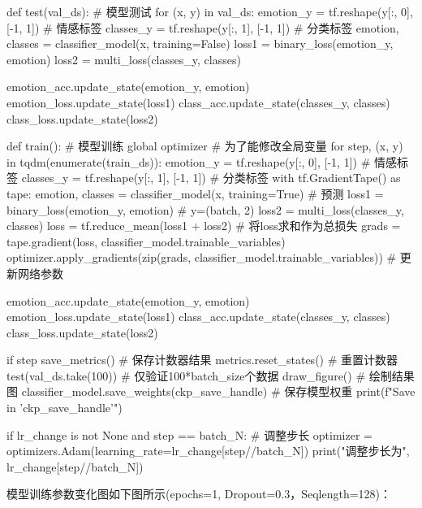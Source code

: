 \documentclass[12pt, a4paper, oneside]{ctexart}
\numberwithin{equation}{section}  %
\begin{document}
\begin{pythoncode}
def test(val_ds):  # 模型测试
    for (x, y) in val_ds:
        emotion_y = tf.reshape(y[:, 0], [-1, 1])  # 情感标签
        classes_y = tf.reshape(y[:, 1], [-1, 1])  # 分类标签
        emotion, classes = classifier_model(x, training=False)
        loss1 = binary_loss(emotion_y, emotion)
        loss2 = multi_loss(classes_y, classes)

        emotion_acc.update_state(emotion_y, emotion)
        emotion_loss.update_state(loss1)
        class_acc.update_state(classes_y, classes)
        class_loss.update_state(loss2)

def train():  # 模型训练
    global optimizer  # 为了能修改全局变量
    for step, (x, y) in tqdm(enumerate(train_ds)):
        emotion_y = tf.reshape(y[:, 0], [-1, 1])  # 情感标签
        classes_y = tf.reshape(y[:, 1], [-1, 1])  # 分类标签
        with tf.GradientTape() as tape:
            emotion, classes = classifier_model(x, training=True)  # 预测
            loss1 = binary_loss(emotion_y, emotion)  # y=(batch, 2)
            loss2 = multi_loss(classes_y, classes)
            loss = tf.reduce_mean(loss1 + loss2)  # 将loss求和作为总损失
        grads = tape.gradient(loss, classifier_model.trainable_variables)
        optimizer.apply_gradients(zip(grads, classifier_model.trainable_variables))  # 更新网络参数

        emotion_acc.update_state(emotion_y, emotion)
        emotion_loss.update_state(loss1)
        class_acc.update_state(classes_y, classes)
        class_loss.update_state(loss2)

        if step %
            save_metrics()  # 保存计数器结果
            metrics.reset_states()  # 重置计数器
            test(val_ds.take(100))  # 仅验证100*batch_size个数据
            draw_figure()  # 绘制结果图
            classifier_model.save_weights(ckp_save_handle)  # 保存模型权重
            print(f"Save in '{ckp_save_handle}'")

        if lr_change is not None and step == batch_N:  # 调整步长
            optimizer = optimizers.Adam(learning_rate=lr_change[step//batch_N])
            print("调整步长为", lr_change[step//batch_N])
\end{pythoncode}
模型训练参数变化图如下图所示(epochs=1, Dropout=0.3，Seqlength=128)：
\end{document}
